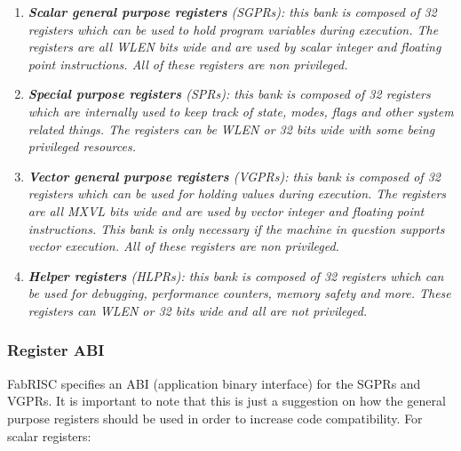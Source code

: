         \begin{enumerate}

            \item \textit{\textbf{Scalar general purpose registers} (SGPRs): this bank is composed of 32 registers which can be used to hold program variables during execution. The registers are all WLEN bits wide and are used by scalar integer and floating point instructions. All of these registers are non privileged.}

            \item \textit{\textbf{Special purpose registers} (SPRs): this bank is composed of 32 registers which are internally used to keep track of state, modes, flags and other system related things. The registers can be WLEN or 32 bits wide with some being privileged resources.}

            \item \textit{\textbf{Vector general purpose registers} (VGPRs): this bank is composed of 32 registers which can be used for holding values during execution. The registers are all MXVL bits wide and are used by vector integer and floating point instructions. This bank is only necessary if the machine in question supports vector execution. All of these registers are non privileged.}

            \item \textit{\textbf{Helper registers} (HLPRs): this bank is composed of 32 registers which can be used for debugging, performance counters, memory safety and more. These registers can WLEN or 32 bits wide and all are not privileged.}

        \end{enumerate}

        \vspace{10pt}
        
        \vspace{10pt}

        \subsubsection{Register ABI}

            \vspace{10pt}

            FabRISC specifies an ABI (application binary interface) for the SGPRs and VGPRs. It is important to note that this is just a suggestion on how the general purpose registers should be used in order to increase code compatibility. For scalar registers:

